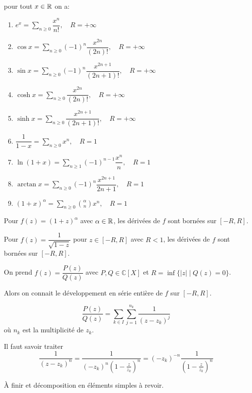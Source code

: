 \documentclass[a4paper, 12pt]{article}
\begin{document}
\begin{proposition}
    pour tout $x \in \mathbb{R}$ on a:
    \begin{enumerate}
        \item $e^x = \sum\limits_{n \geq 0} \dfrac{x^n}{n!}, \quad R = +\infty$
        \item $\cos x = \sum\limits_{n \geq 0} (-1)^n \dfrac{x^{2n}}{(2n)!}, \quad R = +\infty$
        \item $\sin x = \sum\limits_{n \geq 0} (-1)^n \dfrac{x^{2n + 1}}{(2n + 1)!}, \quad R = +\infty$
        \item $\cosh x = \sum\limits_{n \geq 0} \dfrac{x^{2n}}{(2n)!}, \quad R = +\infty$
        \item $\sinh x = \sum\limits_{n \geq 0} \dfrac{x^{2n + 1}}{(2n + 1)!}, \quad R = +\infty$
        \item $\dfrac{1}{1 - x} = \sum\limits_{n \geq 0} x^n, \quad R = 1$
        \item $\ln(1 + x) = \sum\limits_{n \geq 1} (-1)^{n - 1} \dfrac{x^n}{n}, \quad R = 1$
        \item $\arctan x = \sum\limits_{n \geq 0} (-1)^n \dfrac{x^{2n + 1}}{2n + 1}, \quad R = 1$
        \item $(1 + x)^\alpha = \sum\limits_{n \geq 0} \binom{\alpha}{n} x^n, \quad R = 1$
    \end{enumerate}
\end{proposition}

\begin{exemple}
    Pour $f(z) = (1 + z)^\alpha$ avec $\alpha \in \mathbb{R}$, les dérivées de $f$ sont bornées sur $[-R, R]$.
\end{exemple}

\begin{exemple}
    Pour $f(z) = \dfrac{1}{\sqrt{1 - z}}$ pour $z \in [-R, R]$ avec $R < 1$, les dérivées de $f$ sont bornées sur $[-R, R]$.
\end{exemple}

\begin{proposition}{}{}
    On prend $f(z) = \dfrac{P(z)}{Q(z)}$ avec $P, Q \in \mathbb{C}[X]$ et $R = \inf\{|z| \mid Q(z) = 0\}$.

    Alors on connait le développement en série entière de $f$ sur $[-R, R]$.

    $$
    \dfrac{P(z)}{Q(z)} = \sum_{k \in I} \sum_{j = 1}^{n_k} \dfrac{1}{(z - z_k)^j}
    $$
    où $n_k$ est la multiplicité de $z_k$.

    Il faut savoir traiter
    $$
    \dfrac{1}{(z - z_k)^n} = \dfrac{1}{(-z_k)^n(1 - \frac{z}{z_k})^n} = (-z_k)^{-n} \dfrac{1}{(1 - \frac{z}{z_k})^n}
    $$
    \begin{hotwarn}
        À finir et décomposition en éléments simples à revoir.
    \end{hotwarn}
\end{proposition}
\end{document}
